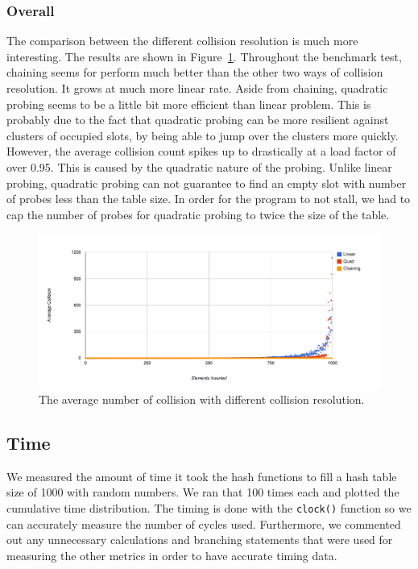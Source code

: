 \documentclass[11pt]{article}
\begin{document}
\subsubsection{Overall}
The comparison between the different collision resolution is much more interesting.
The results are shown in Figure~\ref{fig:collision}.
Throughout the benchmark test, chaining seems for perform much better than the other
two ways of collision resolution. It grows at much more linear rate. 
Aside from chaining, quadratic probing seems to be a little bit more 
efficient than linear problem. This is probably due to the fact that quadratic probing 
can be more resilient against clusters of occupied slots, by being able to jump over
the clusters more quickly. However, the average collision count spikes up to drastically
at a load factor of over 0.95. This is caused by the quadratic nature of the probing. Unlike linear
probing, quadratic probing can not guarantee to find an empty slot with number of probes
less than the table size. In order for the program to not stall, we had to cap the number of probes for quadratic probing to twice the size of the table.

\begin{figure}
        
                \centering
                \includegraphics[width=\textwidth]{collision-all.png}
              \caption{The average number of collision with different collision resolution.}
              \label{fig:collision}
\end{figure}


\subsection{Time}
We measured the amount of time it took the hash functions to fill a hash table
size of 1000 with random numbers. We ran that 100 times each and plotted the
cumulative time distribution. The timing is done with the \texttt{clock()} 
function so we can accurately measure the number of cycles used. 
Furthermore, we commented out any unnecessary calculations and 
branching statements that were used for measuring the other metrics 
in order to have accurate timing data.
\end{document}
